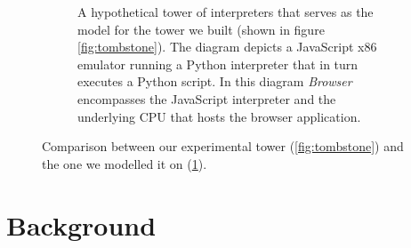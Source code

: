 \documentclass[a4paper,12pt,twoside,openright]{report}
\theoremstyle{definition}
\begin{document}
\begin{figure}[htp!]
\begin{subfigure}[htp!]{\linewidth}
            \caption{A hypothetical tower of interpreters that serves as the model for the tower we built (shown in figure \ref{fig:tombstone}). The diagram depicts a JavaScript x86 emulator running a Python interpreter that in turn executes a Python script. In this diagram \textit{Browser} encompasses the JavaScript interpreter and the underlying CPU that hosts the browser application.}
            \label{fig:tombstone_practical}
    \end{subfigure}
    \caption{Comparison between our experimental tower (\ref{fig:tombstone}) and the one we modelled it on  (\ref{fig:tombstone_practical}).}
    \label{fig:tombstone_all}
\end{figure}
\newpage

\section{Background}\label{sec:background}
\end{document}
